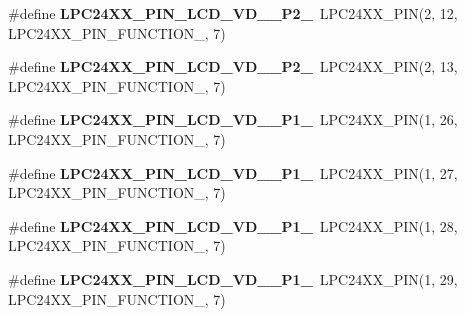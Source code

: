 \begin{DoxyCompactItemize}
\item 
\mbox{\label{group__lpc24xx__io_gaabdef4c7008e6aba3743feb29d937eec}} 
\#define {\bfseries L\+P\+C24\+X\+X\+\_\+\+P\+I\+N\+\_\+\+L\+C\+D\+\_\+\+V\+D\+\_\+\_\+\+P2\+\_}~L\+P\+C24\+X\+X\+\_\+\+P\+IN(2, 12, L\+P\+C24\+X\+X\+\_\+\+P\+I\+N\+\_\+\+F\+U\+N\+C\+T\+I\+O\+N\+\_, 7)
\item 
\mbox{\label{group__lpc24xx__io_gaa65b04fd6bd0c16a8ce7096a96479c69}} 
\#define {\bfseries L\+P\+C24\+X\+X\+\_\+\+P\+I\+N\+\_\+\+L\+C\+D\+\_\+\+V\+D\+\_\+\_\+\+P2\+\_}~L\+P\+C24\+X\+X\+\_\+\+P\+IN(2, 13, L\+P\+C24\+X\+X\+\_\+\+P\+I\+N\+\_\+\+F\+U\+N\+C\+T\+I\+O\+N\+\_, 7)
\item 
\mbox{\label{group__lpc24xx__io_ga5432f3cce2e22decf3c91afc6e5da12f}} 
\#define {\bfseries L\+P\+C24\+X\+X\+\_\+\+P\+I\+N\+\_\+\+L\+C\+D\+\_\+\+V\+D\+\_\+\_\+\+P1\+\_}~L\+P\+C24\+X\+X\+\_\+\+P\+IN(1, 26, L\+P\+C24\+X\+X\+\_\+\+P\+I\+N\+\_\+\+F\+U\+N\+C\+T\+I\+O\+N\+\_, 7)
\item 
\mbox{\label{group__lpc24xx__io_ga435b970140f1aa1c41247b1d484ada59}} 
\#define {\bfseries L\+P\+C24\+X\+X\+\_\+\+P\+I\+N\+\_\+\+L\+C\+D\+\_\+\+V\+D\+\_\+\_\+\+P1\+\_}~L\+P\+C24\+X\+X\+\_\+\+P\+IN(1, 27, L\+P\+C24\+X\+X\+\_\+\+P\+I\+N\+\_\+\+F\+U\+N\+C\+T\+I\+O\+N\+\_, 7)
\item 
\mbox{\label{group__lpc24xx__io_gacbd7f7e95754582837298c5588e40b73}} 
\#define {\bfseries L\+P\+C24\+X\+X\+\_\+\+P\+I\+N\+\_\+\+L\+C\+D\+\_\+\+V\+D\+\_\+\_\+\+P1\+\_}~L\+P\+C24\+X\+X\+\_\+\+P\+IN(1, 28, L\+P\+C24\+X\+X\+\_\+\+P\+I\+N\+\_\+\+F\+U\+N\+C\+T\+I\+O\+N\+\_, 7)
\item 
\mbox{\label{group__lpc24xx__io_gab9430dafefe39a15df00600bf49ab5b4}} 
\#define {\bfseries L\+P\+C24\+X\+X\+\_\+\+P\+I\+N\+\_\+\+L\+C\+D\+\_\+\+V\+D\+\_\+\_\+\+P1\+\_}~L\+P\+C24\+X\+X\+\_\+\+P\+IN(1, 29, L\+P\+C24\+X\+X\+\_\+\+P\+I\+N\+\_\+\+F\+U\+N\+C\+T\+I\+O\+N\+\_, 7)
\end{DoxyCompactItemize}

